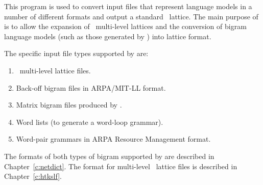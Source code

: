%
%

\newpage
{}


This program is used to convert input files that represent language
models in a number of different formats and output a standard
\HTK\ lattice. The main purpose of  is to allow the
expansion of \HTK\ multi-level lattices and the conversion of
bigram language models (such as those generated by )
into lattice format. 

The specific input file types supported by  are:
\begin{enumerate}
\item \HTK\ multi-level lattice files.
\item Back-off bigram files in ARPA/MIT-LL format.
\item Matrix bigram files produced by .
\item Word lists (to generate a word-loop grammar).
\item Word-pair grammars in ARPA Resource Management format.
\end{enumerate}

The formats of both types of bigram supported by  
are described in Chapter~\ref{c:netdict}. The format for multi-level
\HTK\ lattice files is described in Chapter~\ref{c:htkslf}.

